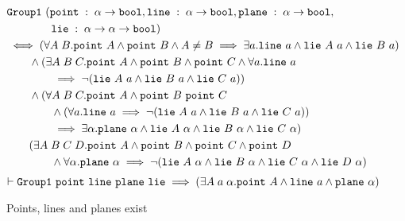 \begin{figure}
  \begin{align*}
    &\code{Group1}\ (\code{point}\;:\;\alpha\rightarrow\code{bool}, \code{line}\;:\;\alpha\rightarrow\code{bool},\code{plane}\;:\;\alpha\rightarrow\code{bool},\\
    &\qquad\qquad\code{lie}\;:\;\alpha\rightarrow\alpha\rightarrow\code{bool})\\
    &\iff (\forall A\; B. \code{point}\ A \wedge \code{point}\ B \wedge A \neq B \implies \exists a. \code{line}\ a \wedge \code{lie}\ A\ a \wedge \code{lie}\ B\ a)\\
    &\qquad\wedge (\exists A\;B\;C. \code{point}\ A \wedge \code{point}\ B \wedge \code{point}\ C \wedge \forall a. \code{line}\ a\\
    &\qquad\qquad\implies \neg(\code{lie}\ A\ a \wedge \code{lie}\ B\ a \wedge \code{lie}\ C\ a))\\
    &\qquad\wedge(\forall A\;B\;C. \code{point}\ A \wedge \code{point}\ B\ \code{point}\ C\\
    &\qquad\qquad\wedge (\forall a. \code{line}\ a \implies \neg(\code{lie}\ A\ a \wedge \code{lie}\ B\ a \wedge \code{lie}\ C\ a))\\
    &\qquad\qquad\implies\exists\alpha. \code{plane}\ \alpha \wedge \code{lie}\ A\ \alpha \wedge \code{lie}\ B\ \alpha \wedge \code{lie}\ C\ \alpha)\\
    &\qquad (\exists A\;B\;C\;D. \code{point}\ A \wedge \code{point}\ B \wedge \code{point}\ C \wedge \code{point}\ D\\
    &\qquad\qquad \wedge \forall\alpha. \code{plane}\ \alpha \implies \neg(\code{lie}\ A\ \alpha \wedge \code{lie}\ B\ \alpha \wedge \code{lie}\ C\ \alpha \wedge \code{lie}\ D\ \alpha)\\
  \end{align*}
  \begin{displaymath}
    \vdash \texttt{Group1}\ \texttt{point}\ \texttt{line}\ \texttt{plane}\ \texttt{lie} \implies (\exists A\;a\;\alpha. \texttt{point}\ A \wedge \texttt{line}\ a \wedge \texttt{plane}\ \alpha)
  \end{displaymath}
\caption{Points, lines and planes exist}
\label{fig:InhabitedTypes}
\end{figure}


